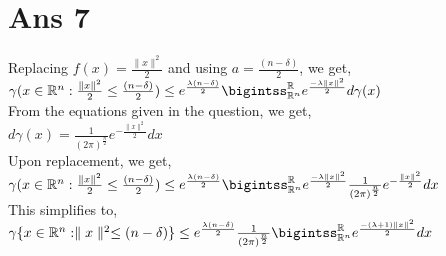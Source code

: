 \documentclass[10pt]{article}
\begin{document}
\section*{Ans 7}
\begin{flushleft}
Replacing $f(x) = \frac{\parallel x \parallel ^{2}}{2}$ and using $a = \frac{(n - \delta)}{2}$, we get,\\
\vspace{0.5em}
$\gamma(x \in \mathbb{R} ^{n}: \frac{\parallel x \parallel ^{2}}{2} \leq \frac{(n - \delta)}{2}) \leq e^{\frac{\lambda (n - \delta)}{2}} \bigintss_{\mathbb{R} ^{n}}^{\mathbb{R}} e^{\frac{-\lambda \parallel x \parallel ^{2}}{2}} d \gamma(x)$\\
\vspace{0.5em}
From the equations given in the question, we get,\\
\vspace{0.5em}
$d \gamma(x) = \frac{1}{(2\pi)^\frac{n}{2}} e^{-\frac{\parallel x \parallel^{2}}{2}} dx$\\
Upon replacement, we get,\\
\vspace{0.5em}
$\gamma(x \in \mathbb{R} ^{n}: \frac{\parallel x \parallel ^{2}}{2} \leq \frac{(n - \delta)}{2}) \leq e^{\frac{\lambda (n - \delta)}{2}} \bigintss_{\mathbb{R} ^{n}}^{\mathbb{R}} e^{\frac{-\lambda \parallel x \parallel ^{2}}{2}} \frac{1}{(2\pi)^\frac{n}{2}} e^{-\frac{\parallel x \parallel^{2}}{2}} dx$\\
This simplifies to,\\
\vspace{0.5em}
$\gamma\{x \in \mathbb{R} ^{n}: \parallel x \parallel ^{2} \leq (n - \delta)\} \leq e^{\frac{\lambda (n - \delta)}{2}} \frac{1}{(2\pi)^\frac{n}{2}}  \bigintss_{\mathbb{R} ^{n}}^{\mathbb{R}} e^{\frac{-(\lambda +1)\parallel x \parallel ^{2}}{2}} dx$\\
\end{flushleft}
\end{document}
